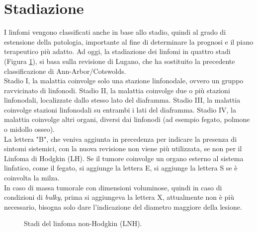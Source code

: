 \section{Stadiazione}
I linfomi vengono classificati anche in base allo stadio, quindi al grado di estensione della patologia, 
importante al fine di determinare la prognosi e il piano terapeutico più adatto. 
Ad oggi, la stadiazione dei linfomi in quattro stadi (Figura \ref{fig:FIGURE_2.14}), si basa sulla revisione di 
Lugano, che ha sostituito la precedente classificazione di Ann-Arbor/Cotswolds\cite{AIOM}.\\
Stadio I, la malattia coinvolge solo una stazione linfonodale, ovvero un gruppo ravvicinato di linfonodi. 
Stadio II, la malattia coinvolge due o più stazioni linfonodali, localizzate dallo stesso lato del diaframma. 
Stadio III, la malattia coinvolge stazioni linfonodali su entrambi i lati del diaframma. 
Stadio IV, la malattia coinvolge altri organi, diversi dai linfonodi (ad esempio fegato, polmone o midollo osseo)\cite{LLS}.\\
La lettera "B", che veniva aggiunta in precedenza per indicare la presenza di sintomi sistemici, 
con la nuova revisione non viene più utilizzata, se non per il Linfoma di Hodgkin (LH)\cite{AIOM}.
Se il tumore coinvolge un organo esterno al sistema linfatico, come il fegato, si aggiunge la lettera E, 
si aggiunge la lettera S se è coinvolta la milza\cite{ISTGENT}.\\
In caso di massa tumorale con dimensioni voluminose, quindi in caso di condizioni di \emph{bulky}, 
prima si aggiungeva la lettera X, attualmente non è più necessario, 
bisogna solo dare l’indicazione del diametro maggiore della lesione\cite{AIOM}.

\begin{figure}[H]
    \begin{center}
    \vspace{-3mm}
    \end{center}
    \caption{Stadi del linfoma non-Hodgkin (LNH).
    \cite{LLS}}
    \label{fig:FIGURE_2.14}
\end{figure}

